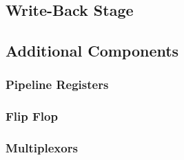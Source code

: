 \subsection{Write-Back Stage}
\newpage
\subsection{Additional Components}
\newpage
\subsubsection{Pipeline Registers}
\newpage
\subsubsection{Flip Flop}
\newpage
\subsubsection{Multiplexors}
\newpage

